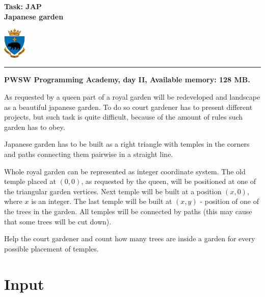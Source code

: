 \documentclass[10pt]{article}
\begin{document}
    

    \noindent
    \begin{minipage}{0.5\textwidth}
        \LARGE{\textsf{\textbf{Task: JAP\\Japanese garden}}}
    \end{minipage}
    \begin{minipage}{0.5\textwidth}
        \begin{flushright}
            \includegraphics[height=1.5cm]{logo.jpg}
        \end{flushright}
    \end{minipage}
    
    \noindent\rule{\textwidth}{0.4pt}
    
    \noindent\textbf{PWSW Programming Academy, day II, Available memory: 128 MB.}
    \vspace{1em}
    
    
    \noindent
    As requested by a queen part of a royal garden will be redeveloped and landscape as a beautiful japanese garden. To do so court gardener has to present different projects, but such task is quite difficult, because of the amount of rules such garden has to obey.
    
    Japanese garden has to be built as a right triangle with temples in the corners and paths connecting them pairwise in a straight line.
    
    Whole royal garden can be represented as integer coordinate system. The old temple placed at $(0, 0)$, as requested by the queen, will be positioned at one of the triangular garden vertices. Next temple will be built at a position $(x, 0)$, where $x$ is an integer. The last temple will be built at $(x, y)$ - position of one of the trees in the garden. All temples will be connected by paths (this may cause that some trees will be cut down).
    
    Help the court gardener and count how many trees are inside a garden for every possible placement of temples.   


    \section*{Input}
    
\end{document}
